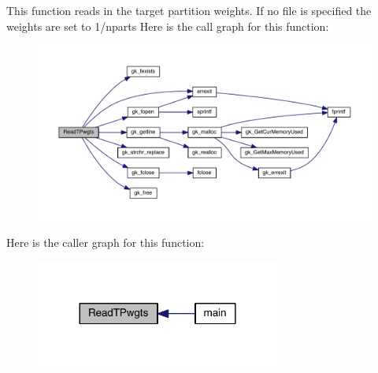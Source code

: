 This function reads in the target partition weights. If no file is specified the weights are set to 1/nparts Here is the call graph for this function\+:\nopagebreak
\begin{figure}[H]
\begin{center}
\leavevmode
\includegraphics[width=350pt]{a00948_a12b940ccee061b8787088fbe16245f46_cgraph}
\end{center}
\end{figure}
Here is the caller graph for this function\+:\nopagebreak
\begin{figure}[H]
\begin{center}
\leavevmode
\includegraphics[width=228pt]{a00948_a12b940ccee061b8787088fbe16245f46_icgraph}
\end{center}
\end{figure}
\mbox{\label{a00948_a4c231449fdf45c79d8d5107ad63b3451}} 
